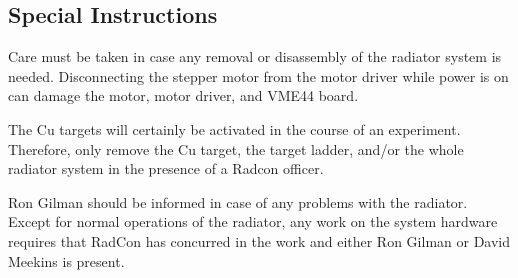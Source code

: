 {\subsection{Special Instructions}

Care must be taken in case any removal or disassembly of the radiator
system is needed.
Disconnecting the stepper motor from the motor driver
while power is on can damage the motor, motor driver, and VME44 board.

The Cu targets will certainly be activated in the course of an experiment.
Therefore, only remove the Cu target, the target ladder,
and/or the whole radiator system in the presence of a Radcon officer.

Ron Gilman should be informed in case of any problems with the radiator.
Except for normal operations of the radiator, any work on the
system hardware requires that RadCon has concurred in the work and
either Ron Gilman or David Meekins is present.

}
%
%
%
%
%
